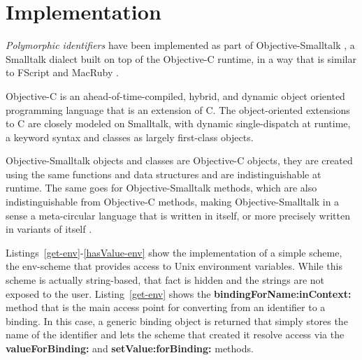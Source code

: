 \documentclass[preprint,authoryear]{acm_proc_article-sp}
\begin{document}

\section{Implementation}
\label{implementation}

\emph{Polymorphic identifiers} have been implemented as part of Objective-Smalltalk \cite{objst},
a Smalltalk dialect built on top of the Objective-C\cite{objc-evol}\cite{objc-apple} runtime, 
in a way that is similar to FScript\cite{fscript} and MacRuby \cite{macruby}.

Objective-C is an ahead-of-time-compiled, hybrid, and dynamic object oriented programming language
that is an extension of C.  The object-oriented extensions to C are closely modeled on
Smalltalk, with dynamic single-dispatch at runtime, a keyword syntax and classes as
largely first-class objects.

Objective-Smalltalk objects and classes are Objective-C objects, they are created using
the same functions and data structures and are indistinguishable at runtime.
The same goes for Objective-Smalltalk methods, which are also indistinguishable from
Objective-C methods, making Objective-Smalltalk in a sense a meta-circular language
that is written in itself, or more precisely written in variants of itself \cite{kleinvm}\cite{squeak}.

Listings~\ref{get-env}-\ref{hasValue-env} show the implementation of a simple scheme,
the env-scheme that provides access to Unix environment variables.  While this scheme
is actually string-based, that fact is hidden and the strings are not exposed to the user.
Listing~\ref{get-env}
shows the {\bf bindingForName:inContext:} method that is the main access point for
converting from an identifier to a binding.  In this case, a generic binding object is returned
that simply stores the name of the identifier and lets the scheme that created it resolve
access via the {\bf valueForBinding:} and {\bf setValue:forBinding:} methods.

%
%
\end{document}
